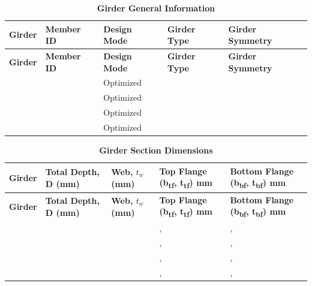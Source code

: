 \documentclass[12pt,a4paper]{report}
\numberwithin{table}{chapter}
\numberwithin{figure}{chapter}
\begin{document}
\newpage

\vspace{0.4em}
\noindent
            
\vspace{4pt}
\begin{longtable}{|L{2.2cm}|L{1.8cm}|p{3.8cm}|p{3.8cm}|p{3.8cm}|}
\caption{\textbf{Girder General Information}}
\hline
{} \textbf{Girder} & \textbf{Member ID} & \textbf{Design Mode} & \textbf{Girder Type} & \textbf{Girder Symmetry} \\[6pt]
\hline
\endfirsthead
\hline
{} \textbf{Girder} & \textbf{Member ID} & \textbf{Design Mode} & \textbf{Girder Type} & \textbf{Girder Symmetry} \\[6pt]
\hline
\endhead
 &  & Optimized &  &  \\[8pt]
\hline
 &  & Optimized &  &  \\[8pt]
\hline
 &  & Optimized &  &  \\[8pt]
\hline
 &  & Optimized &  &  \\[8pt]
\hline
\end{longtable}

\vspace{0.6em}

\vspace{4pt}
\begin{longtable}{|L{1.8cm}|L{2.3cm}|L{1.8cm}|p{4.8cm}|p{4.8cm}|}
\caption{\textbf{Girder Section Dimensions}}
\hline
{} \textbf{Girder} & \textbf{Total Depth, D (mm)} & \textbf{Web, $t_w$ (mm)} & \textbf{Top Flange (b\textsubscript{tf}, t\textsubscript{tf}) mm} & \textbf{Bottom Flange (b\textsubscript{bf}, t\textsubscript{bf}) mm} \\[6pt]
\hline
\endfirsthead
\hline
{} \textbf{Girder} & \textbf{Total Depth, D (mm)} & \textbf{Web, $t_w$ (mm)} & \textbf{Top Flange (b\textsubscript{tf}, t\textsubscript{tf}) mm} & \textbf{Bottom Flange (b\textsubscript{bf}, t\textsubscript{bf}) mm} \\[6pt]
\hline
\endhead
 &  &  & ,  & ,  \\[8pt]
\hline
 &  &  & ,  & ,  \\[8pt]
\hline
 &  &  & ,  & ,  \\[8pt]
\hline
 &  &  & ,  & ,  \\[8pt]
\hline
\end{longtable}

\vspace{0.6em}
\end{document}
